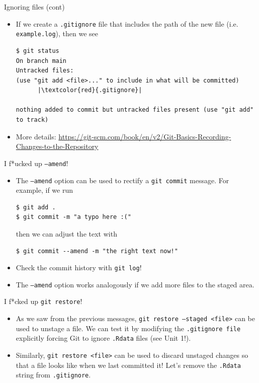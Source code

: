 \documentclass[
hyperref={bookmarks=false},
xcolor={dvipsnames,svgnames*,x11names*}, 
12pt
]{beamer}
\begin{document}
\begin{frame}[fragile]{Ignoring files (cont)}
\vspace{-0.5cm}
\begin{itemize}
\itemsep 2ex
\item If we create a \texttt{.gitignore} file that includes the path of the new file (i.e. \texttt{example.log}), then we see
\begin{lstlisting}
$ git status
On branch main
Untracked files:
(use "git add <file>..." to include in what will be committed)
      |\textcolor{red}{.gitignore}|

nothing added to commit but untracked files present (use "git add" to track)
\end{lstlisting}
\item More details: \url{https://git-scm.com/book/en/v2/Git-Basics-Recording-Changes-to-the-Repository}
\end{itemize}
\end{frame}

\begin{frame}[fragile]{I f*ucked up  \texttt{--amend}!}
\vspace{-0.5cm}
\begin{itemize}
\itemsep 2ex
\item The \texttt{--amend} option can be used to rectify a \texttt{git commit} message. For example, if we run
\begin{lstlisting}
$ git add . 
$ git commit -m "a typo here :("
\end{lstlisting} 
then we can adjust the text with
\begin{lstlisting}
$ git commit --amend -m "the right text now!"
\end{lstlisting}
\item Check the commit history with \texttt{git log}!
\item The \texttt{--amend} option works analogously if we add more files to the staged area. 
\end{itemize}
\end{frame}

\begin{frame}[fragile]{I f*cked up  \texttt{git restore}!}
\vspace{-0.5cm}
\begin{itemize}
\itemsep 2ex
\item As we saw from the previous messages, \texttt{git restore --staged <file>} can be used to unstage a file. We can test it by modifying the \texttt{.gitignore file} explicitly forcing Git to ignore \texttt{.Rdata} files (see Unit 1!).
\item Similarly, \texttt{git restore <file>} can be used to discard unstaged changes so that a file looks like when we last committed it! Let's remove the \texttt{.Rdata} string from \texttt{.gitignore}. 
\end{itemize}
\end{frame}
\end{document}
